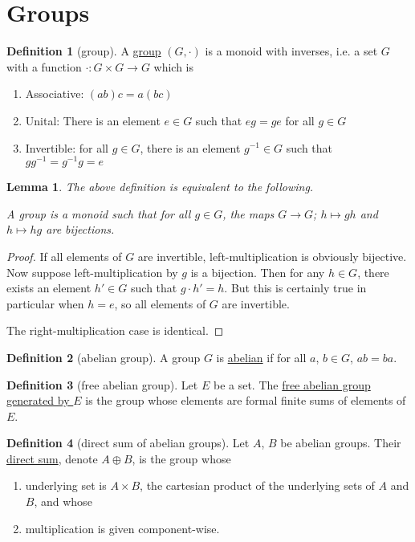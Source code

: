 \documentclass[a4paper]{report}
\newcommand{\defn}[1]{\ul{#1}}
\theoremstyle{definition}
\newtheorem{definition}{Definition}[section]
\theoremstyle{plain}
\newtheorem{lemma}{Lemma}[section]
\theoremstyle{remark}
\begin{document}
\section{Groups}
\begin{definition}[group]
  \label{def:group}
  A \defn{group} $(G, \cdot)$ is a monoid with inverses, i.e. a set $G$ with a function $\cdot\colon G \times G \to G$ which is
  \begin{enumerate}
    \item Associative: $(ab)c = a(bc)$
    \item Unital: There is an element $e \in G$ such that $eg = ge$ for all $g \in G$
    \item Invertible: for all $g \in G$, there is an element $g^{-1} \in G$ such that $gg^{-1} = g^{-1}g = e$
  \end{enumerate}
\end{definition}

\begin{lemma}
  The above definition is equivalent to the following. 

  A group is a monoid such that for all $g \in G$, the maps $G \to G$; $h \mapsto gh$ and $h \mapsto hg$ are bijections.
\end{lemma}
\begin{proof}
  If all elements of $G$ are invertible, left-multiplication is obviously bijective. Now suppose left-multiplication by $g$ is a bijection. Then for any $h \in G$, there exists an element $h' \in G$ such that $g \cdot h' = h$. But this is certainly true in particular when $h = e$, so all elements of $G$ are invertible.

  The right-multiplication case is identical.
\end{proof}

\begin{definition}[abelian group]
  \label{def:abeliangroup}
  A group $G$ is \defn{abelian} if for all $a$, $b \in G$, $ab=ba$.
\end{definition}

\begin{definition}[free abelian group]
  \label{def:freeabeliangroup}
  Let $E$ be a set. The \defn{free abelian group generated by $E$} is the group whose elements are formal finite sums of elements of $E$.
\end{definition}

\begin{definition}[direct sum of abelian groups]
  \label{def:directsumofabeliangroup}
  Let $A$, $B$ be abelian groups. Their \defn{direct sum}, denote $A \oplus B$, is the group whose
  \begin{enumerate}
    \item underlying set is $A \times B$, the cartesian product of the underlying sets of $A$ and $B$, and whose

    \item multiplication is given component-wise.
  \end{enumerate}
\end{definition}
\end{document}
